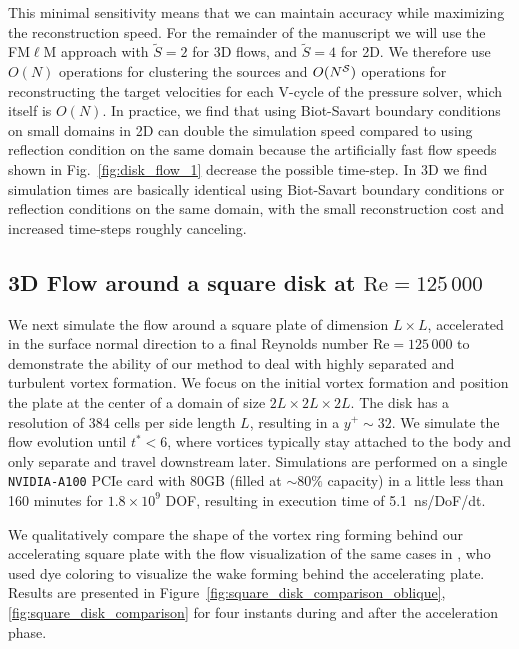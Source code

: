 \documentclass[final,1p,times]{elsarticle}
\begin{document}
This minimal sensitivity means that we can maintain accuracy while maximizing the reconstruction speed. For the remainder of the manuscript we will use the FM$\ell$M approach with $\tilde S = 2$ for 3D flows, and $\tilde S = 4$ for 2D. We therefore use $O(N)$ operations for clustering the sources and $O(N^{\cal S})$ operations for reconstructing the target velocities for each V-cycle of the pressure solver, which itself is $O(N)$. In practice, we find that using Biot-Savart boundary conditions on small domains in 2D can double the simulation speed compared to using reflection condition on the same domain because the artificially fast flow speeds shown in Fig.~\ref{fig:disk_flow_1} decrease the possible time-step. In 3D we find simulation times are basically identical using Biot-Savart boundary conditions or reflection conditions on the same domain, with the small reconstruction cost and increased time-steps roughly canceling.

\subsection{3D Flow around a square disk at $\text{Re}=125\,000$}

We next simulate the flow around a square plate of dimension $L\times L$, accelerated in the surface normal direction to a final Reynolds number $\text{Re}=125\,000$ to demonstrate the ability of our method to deal with highly separated and turbulent vortex formation. We focus on the initial vortex formation and position the plate at the center of a domain of size $2L\times2L\times2L$. The disk has a resolution of 384 cells per side length $L$, resulting in a $y^+\sim 32$. We simulate the flow evolution until $t^*<6$, where vortices typically stay attached to the body and only separate and travel downstream later. Simulations are performed on a single \texttt{NVIDIA-A100} PCIe card with 80GB (filled at $\sim80\%$ capacity) in a little less than 160 minutes for $1.8\times10^9$ DOF, resulting in execution time of 5.1~ns/DoF/dt.


We qualitatively compare the shape of the vortex ring forming behind our accelerating square plate with the flow visualization of the same cases in \cite{Higuchi1996Three-dimensionalPlates}, who used dye coloring to visualize the wake forming behind the accelerating plate. Results are presented in Figure~\ref{fig:square_disk_comparison_oblique}, \ref{fig:square_disk_comparison} for four instants during and after the acceleration phase. 
\end{document}
